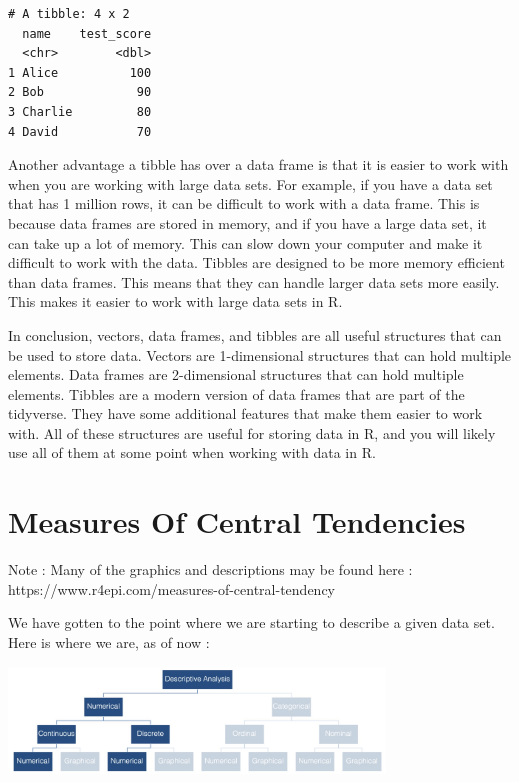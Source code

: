 \documentclass[
  letterpaper,
  DIV=11,
  numbers=noendperiod]{scrreprt}
\begin{document}
\begin{verbatim}
# A tibble: 4 x 2
  name    test_score
  <chr>        <dbl>
1 Alice          100
2 Bob             90
3 Charlie         80
4 David           70
\end{verbatim}

Another advantage a tibble has over a data frame is that it is easier to
work with when you are working with large data sets. For example, if you
have a data set that has 1 million rows, it can be difficult to work
with a data frame. This is because data frames are stored in memory, and
if you have a large data set, it can take up a lot of memory. This can
slow down your computer and make it difficult to work with the data.
Tibbles are designed to be more memory efficient than data frames. This
means that they can handle larger data sets more easily. This makes it
easier to work with large data sets in R.

In conclusion, vectors, data frames, and tibbles are all useful
structures that can be used to store data. Vectors are 1-dimensional
structures that can hold multiple elements. Data frames are
2-dimensional structures that can hold multiple elements. Tibbles are a
modern version of data frames that are part of the tidyverse. They have
some additional features that make them easier to work with. All of
these structures are useful for storing data in R, and you will likely
use all of them at some point when working with data in R.


\chapter*{Measures Of Central
Tendencies}\label{measures-of-central-tendencies}


Note : Many of the graphics and descriptions may be found here :
https://www.r4epi.com/measures-of-central-tendency

We have gotten to the point where we are starting to describe a given
data set. Here is where we are, as of now :

\includegraphics[width=0.75\textwidth,height=\textheight]{./images/Daily-4-Pic-1.jpg}
\end{document}
